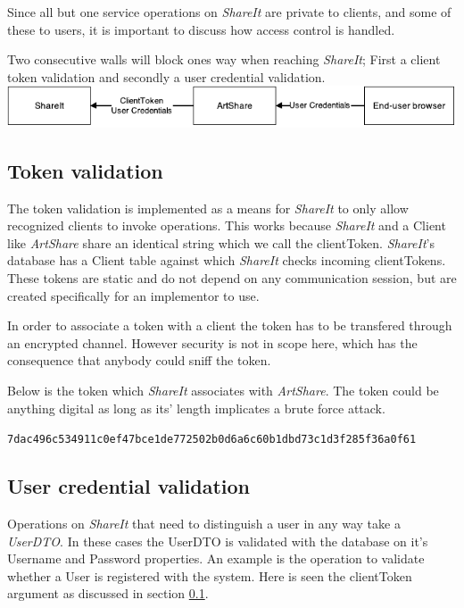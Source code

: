 \documentclass[../report.tex]{subfiles}
\begin{document}
\graphicspath{{img/}{../img/}}


Since all but one service operations on \textit{ShareIt} are private to clients, and some of these to users, it is important to discuss how access control is handled.

Two consecutive walls will block ones way when reaching \textit{ShareIt}; First a client token validation and secondly a user credential validation. \\

\includegraphics[width=\linewidth]{./AccessControlDeployment.pdf}

\subsection{Token validation}
\label{sec:Token}

The token validation is implemented as a means for \textit{ShareIt} to only allow recognized clients to invoke operations. This works because \textit{ShareIt} and a Client like \textit{ArtShare} share an identical string which we call the clientToken. \textit{ShareIt}'s database has a Client table against which \textit{ShareIt} checks incoming clientTokens. These tokens are static and do not depend on any communication session, but are created specifically for an implementor to use.

In order to associate a token with a client the token has to be transfered through an encrypted channel. However security is not in scope here, which has the consequence that anybody could sniff the token.

Below is the token which \textit{ShareIt} associates with \textit{ArtShare}. The token could be anything digital as long as its' length implicates a brute force attack.

\begin{center}
\texttt{7dac496c534911c0ef47bce1de772502b0d6a6c60b1dbd73c1d3f285f36a0f61}
\end{center}



\subsection{User credential validation}
\label{sec:UserCredential}

Operations on \textit{ShareIt} that need to distinguish a user in any way take a \textit{UserDTO}. In these cases the UserDTO is validated with the database on it's Username and Password properties. An example is the operation to validate whether a User is registered with the system. Here is seen the clientToken argument as discussed in section \ref{sec:Token}. 
\end{document}
